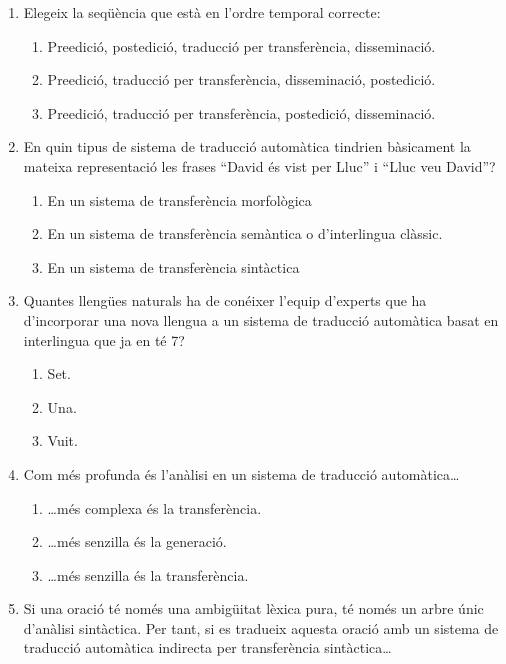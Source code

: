 \begin{enumerate}
\item Elegeix la seqüència que està en l'ordre temporal correcte:
   
\begin{enumerate}
\item Preedició, postedició, traducció per transferència, disseminació.
\item Preedició, traducció per transferència, disseminació, postedició.
\item Preedició, traducció per transferència, postedició, disseminació.
\end{enumerate}
\item En quin tipus de sistema de traducció automàtica tindrien
bàsicament la mateixa representació les frases ``David és vist per
Lluc'' i ``Lluc veu David''?
   
\begin{enumerate}
\item En un sistema de transferència morfològica
\item En un sistema de transferència semàntica o d'interlingua clàssic.
\item En un sistema de transferència sintàctica
\end{enumerate}
\item Quantes llengües naturals ha de conéixer l'equip d'experts
   que ha d'incorporar una nova llengua a un sistema de traducció
   automàtica basat en interlingua que ja en té 7?
   
\begin{enumerate}
\item Set.
\item Una.
\item Vuit.
\end{enumerate}
\item Com més profunda és l'anàlisi en un sistema de traducció
   automàtica{\ldots}
   
\begin{enumerate}
\item {\ldots}més complexa és la transferència.
\item {\ldots}més senzilla és la generació.
\item {\ldots}més senzilla és la transferència.
\end{enumerate}
\item Si una oració té només una ambigüitat lèxica pura, té només
   un arbre únic d'anàlisi sintàctica. Per tant, si es tradueix
   aquesta oració amb un sistema de traducció automàtica indirecta per
   transferència sintàctica{\ldots}
   

\end{enumerate}
